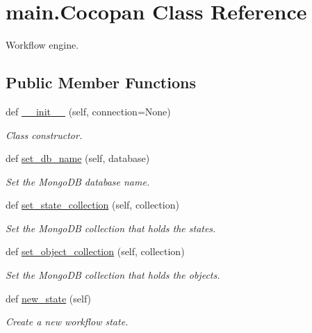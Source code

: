 \hypertarget{classmain_1_1_cocopan}{}\section{main.\+Cocopan Class Reference}
\label{classmain_1_1_cocopan}


Workflow engine.  


\subsection*{Public Member Functions}
\begin{DoxyCompactItemize}
\item 
def \hyperlink{classmain_1_1_cocopan_a50aabe1c07574b61eb293272f1758bdb}{\+\_\+\+\_\+init\+\_\+\+\_\+} (self, connection=None)
\begin{DoxyCompactList}\small\item\em Class constructor. \end{DoxyCompactList}\item 
def \hyperlink{classmain_1_1_cocopan_ab82e9e88bac256826e750485a64645ae}{set\+\_\+db\+\_\+name} (self, database)
\begin{DoxyCompactList}\small\item\em Set the Mongo\+DB database name. \end{DoxyCompactList}\item 
def \hyperlink{classmain_1_1_cocopan_a5a5b5a1bf8d0057b842e726a06fe8ecc}{set\+\_\+state\+\_\+collection} (self, collection)
\begin{DoxyCompactList}\small\item\em Set the Mongo\+DB collection that holds the states. \end{DoxyCompactList}\item 
def \hyperlink{classmain_1_1_cocopan_af17aa6d762d380aa8e3e9d75f906df3b}{set\+\_\+object\+\_\+collection} (self, collection)
\begin{DoxyCompactList}\small\item\em Set the Mongo\+DB collection that holds the objects. \end{DoxyCompactList}\item 
def \hyperlink{classmain_1_1_cocopan_a1caaa06dd31559d6b24ef8503e3f7013}{new\+\_\+state} (self)
\begin{DoxyCompactList}\small\item\em Create a new workflow state. \end{DoxyCompactList}\end{DoxyCompactItemize}
